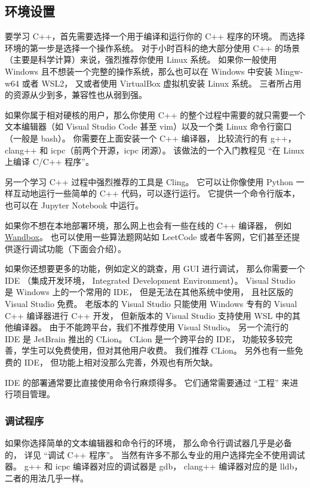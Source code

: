 

\begin{issues}
\issueDraft
\end{issues}

\subsection{环境设置}
要学习 C++，首先需要选择一个用于编译和运行你的 C++ 程序的环境。 而选择环境的第一步是选择一个操作系统。 对于小时百科的绝大部分使用 C++ 的场景（主要是科学计算）来说，强烈推荐你使用 Linux 系统。 如果你一般使用 Windows 且不想装一个完整的操作系统，那么也可以在 Windows 中安装 Mingw-w64 或者 WSL2， 又或者使用 VirtualBox 虚拟机安装 Linux 系统。 三者所占用的资源从少到多，兼容性也从弱到强。

如果你属于相对硬核的用户，那么你使用 C++ 的整个过程中需要的就只需要一个文本编辑器（如 Visual Studio Code 甚至 vim）以及一个类 Linux 命令行窗口（一般是 bash）。 你需要在上面安装一个 C++ 编译器， 比较流行的有 g++， clang++ 和 icpc（前两个开源，icpc 闭源）。 该做法的一个入门教程见 “在 Linux 上编译 C/C++ 程序”。

另一个学习 C++ 过程中强烈推荐的工具是 Cling。 它可以让你像使用 Python 一样互动地运行一些简单的 C++ 代码，可以逐行运行。 它提供一个命令行版本，也可以在 Jupyter Notebook 中运行。

如果你不想在本地部署环境，那么网上也会有一些在线的 C++ 编译器， 例如 \href{https://wandbox.org/}{Wandbox}。 也可以使用一些算法题网站如 LeetCode 或者牛客网，它们甚至还提供逐行调试功能（下面会介绍）。

如果你还想要更多的功能，例如定义的跳查，用 GUI 进行调试， 那么你需要一个 IDE （集成开发环境， Integrated Development Environment）。 Visual Studio 是 Windows 上的一个常用的 IDE， 但是无法在其他系统中使用， 且社区版的 Visual Studio 免费。 老版本的 Visual Studio 只能使用 Windows 专有的 Visual C++ 编译器进行 C++ 开发， 但新版本的 Visual Studio 支持使用 WSL 中的其他编译器。 由于不能跨平台，我们不推荐使用 Visual Studio。 另一个流行的 IDE 是 JetBrain 推出的 CLion。 CLion 是一个跨平台的 IDE， 功能较多较完善，学生可以免费使用，但对其他用户收费。 我们推荐 CLion。 另外也有一些免费的 IDE， 但功能上相对没那么完善，外观也有所欠缺。

IDE 的部署通常要比直接使用命令行麻烦得多。 它们通常需要通过 “工程” 来进行项目管理。

\subsubsection{调试程序}
如果你选择简单的文本编辑器和命令行的环境， 那么命令行调试器几乎是必备的， 详见 “调试 C++ 程序”。 当然有许多不那么专业的用户选择完全不使用调试器。 g++ 和 icpc 编译器对应的调试器是 gdb， clang++ 编译器对应的是 lldb， 二者的用法几乎一样。

